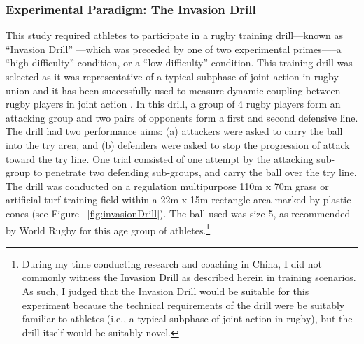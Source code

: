 \begin{CJK}{UTF8}{gbsn}
\subsubsection{Experimental Paradigm: The Invasion Drill}
This study required athletes to participate in a rugby training drill---known as ``Invasion Drill'' \citep{Biscombe1998}---which was preceded by one of two experimental primes—--a ``high difficulty'' condition, or a ``low difficulty'' condition.  This training drill was selected as it was representative of a typical subphase of joint action in rugby union and it has been successfully used to measure dynamic coupling between rugby players in joint action \citep[see][]{Passos2011}.  In this drill, a group of 4 rugby players form an attacking group and two pairs of opponents form a first and second defensive line.  The drill had two performance aims: (a) attackers were asked to carry the ball into the try area, and (b) defenders were asked to stop the progression of attack toward the try line.
One trial consisted of one attempt by the attacking sub-group to penetrate two defending sub-groups, and carry the ball over the try line. The drill was conducted on a regulation multipurpose 110m x 70m grass or artificial turf training field within a 22m x 15m rectangle area marked by plastic cones (see Figure ~\ref{fig:invasionDrill}). The ball used was size 5, as recommended by World Rugby for this age group of athletes.\footnote{During my time conducting research and coaching in China, I did not commonly witness the Invasion Drill as described herein in training scenarios. As such, I judged that the Invasion Drill would be suitable for this experiment because the technical requirements of the drill were be suitably familiar to athletes (i.e., a typical subphase of joint action in rugby), but the drill itself would be suitably novel.}





\end{CJK}
